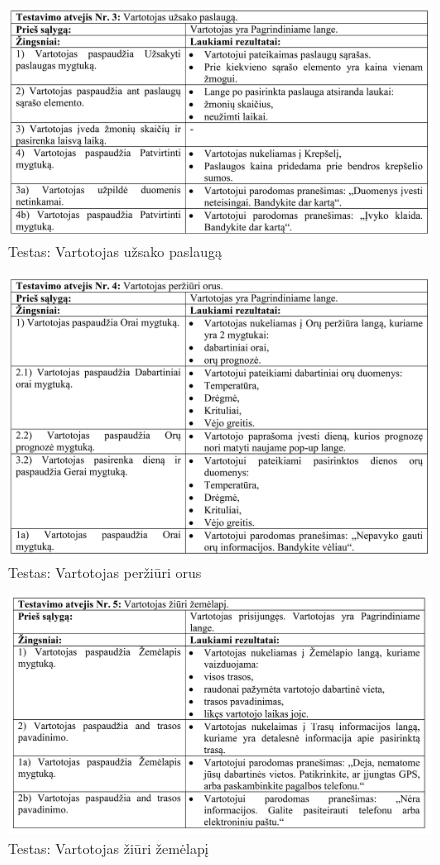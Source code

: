 \documentclass[oneside]{VUMIFPSkursinis}
\begin{document}
			\begin{figure}[h]
    				\centering
    				\includegraphics[width=1\textwidth]{test3.png}
    				\caption{Testas: Vartotojas užsako paslaugą}
    				\label{fig:Testas: Vartotojas užsako paslaugą}
			\end{figure}
			
			\begin{figure}[h]
    				\centering
    				\includegraphics[width=1\textwidth]{test4.png}
    				\caption{Testas: Vartotojas peržiūri orus}
    				\label{fig:Testas: Vartotojas peržiūri orus}
			\end{figure}
			
			\begin{figure}[h]
    				\centering
    				\includegraphics[width=1\textwidth]{test5.png}
    				\caption{Testas: Vartotojas žiūri žemėlapį}
    				\label{fig:Testas: Vartotojas žiūri žemėlapį}
			\end{figure}
			
\end{document}
